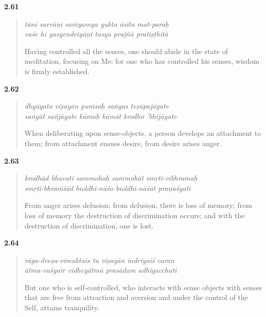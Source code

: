 \par\noindent\textbf{2.61}\par
\begin{verse}
\textit{tāni sarvāṇi saṁyamya yukta āsīta mat-paraḥ} \\
\textit{vaśe hi yasyendriyāṇi tasya prajñā pratiṣṭhitā}

\noindent Having controlled all the senses, one should abide in the state of meditation, focusing on Me; for one who has controlled his senses, wisdom is firmly established.
\end{verse}
\par



\par\noindent\textbf{2.62}\par
\begin{verse}
\textit{dhyāyato viṣayān puṁsaḥ saṅgas teṣūpajāyate} \\
\textit{saṅgāt sañjāyate kāmaḥ kāmāt krodho ’bhijāyate}

\noindent When deliberating upon sense-objects, a person develops an attachment to them; from attachment ensues desire, from desire arises anger.
\end{verse}
\par



\par\noindent\textbf{2.63}\par
\begin{verse}
\textit{krodhād bhavati sammohaḥ sammohāt smṛti-vibhramaḥ} \\
\textit{smṛti-bhraṁśād buddhi-nāśo buddhi-nāśāt praṇaśyati}

\noindent From anger arises delusion; from delusion, there is loss of memory; from loss of memory the destruction of discrimination occurs; and with the destruction of discrimination, one is lost.
\end{verse}
\par



\par\noindent\textbf{2.64}\par
\begin{verse}
\textit{rāga-dveṣa-vimuktais tu viṣayān indriyaiś caran} \\
\textit{ātma-vaśyair vidheyātmā prasādam adhigacchati}

\noindent But one who is self-controlled, who interacts with sense objects with senses that are free from attraction and aversion and under the control of the Self, attains tranquility.
\end{verse}
\par



